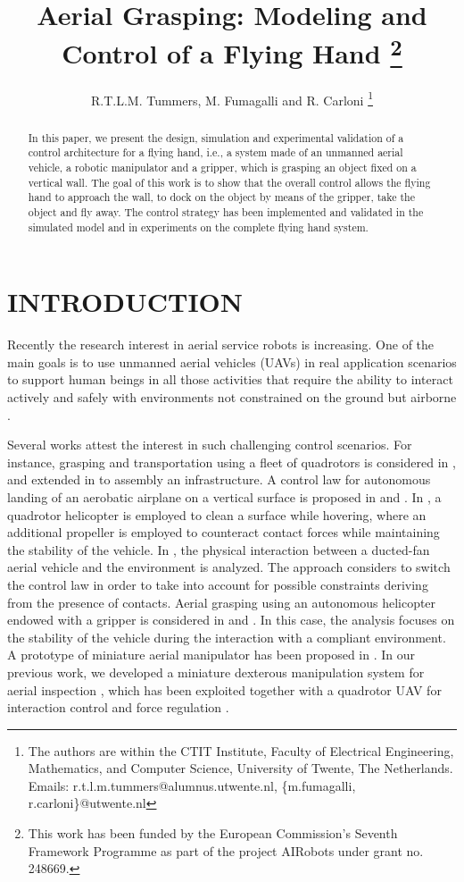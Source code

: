 \documentclass[a4paper, 10pt, conference]{ieeeconf}
\title{\LARGE \bf Aerial Grasping: Modeling and Control of a Flying Hand%
  \thanks{This work has been funded by the European Commission's
    Seventh Framework Programme as part of the project AIRobots under grant no. 248669.
  }
}
\author{R.T.L.M. Tummers, M. Fumagalli and R. Carloni%
  \thanks{The authors are within the CTIT Institute, Faculty of Electrical Engineering, Mathematics, and Computer Science, University of Twente, The Netherlands. Emails:  r.t.l.m.tummers@alumnus.utwente.nl,
    \{m.fumagalli, r.carloni\}@utwente.nl}
}
\begin{document}
\maketitle

\begin{abstract}
In this paper, we present the design, simulation and experimental validation of a control architecture for a flying hand, i.e., a system made of an unmanned aerial vehicle, a robotic manipulator and a gripper, which is grasping an object fixed on a vertical wall. The goal of this work is to show that the overall control allows the flying hand to approach the wall, to dock on the object by means of the gripper, take the object and fly away. The control strategy has been implemented and validated in the simulated model and in experiments on the complete flying hand system.
\end{abstract}



\section{INTRODUCTION}
Recently the research interest in aerial service robots is
increasing. One of the main goals is to use unmanned aerial vehicles
(UAVs) in real application scenarios to support human beings in all
those activities that require the ability to interact actively and safely with environments not constrained on the ground but airborne \cite{airobots,airobots_video}.

Several works attest the interest in such challenging control
scenarios. For instance, grasping and transportation using a fleet of
quadrotors is considered in \cite{penn}, and extended in
\cite{KumarAssembly:2011} to assembly an infrastructure. A control law
for autonomous landing of an aerobatic airplane on a vertical
surface is proposed in \cite{Stanford_Piercing:2010} and
\cite{Frank.McGrew:07}.  In \cite{IPEK_RAM:2010}, a quadrotor
helicopter is employed to clean a surface while hovering, where an
additional propeller is employed to counteract contact forces while
maintaining the stability of the vehicle.  In
\cite{AUTOMATICA2011_FlyingRobot}, the physical interaction between a
ducted-fan aerial vehicle and the environment is analyzed. The
approach considers to switch the control law in order to take into
account for possible constraints deriving from the presence of
contacts.  Aerial grasping using an autonomous helicopter endowed with
a gripper is considered in \cite{yale} and
\cite{PoundsDollar}. In this case, the analysis focuses on the
stability of the vehicle during the interaction with a compliant
environment. A prototype of miniature aerial manipulator has been
proposed in \cite{Oh2011MMUAV}. In our previous work, we developed a miniature dexterous manipulation system for aerial inspection \cite{keemink2012}, which has been exploited together with a quadrotor UAV for interaction control \cite{matteo} and force regulation \cite{scholten2013}.
\end{document}
